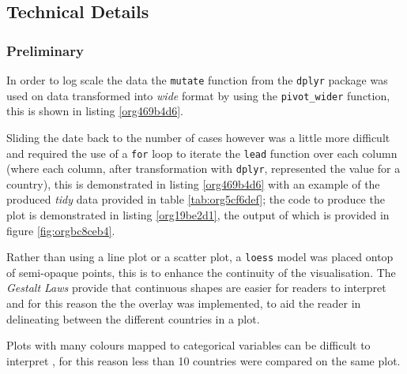 \documentclass[11pt]{article}
\begin{document}
\subsection{Technical Details}
\label{sec:org5b1072b}
\subsubsection{Preliminary}
\label{sec:org8718a60}
In order to log scale the data the \texttt{mutate} function from the \texttt{dplyr} package
was used on data transformed into \emph{wide} format by using the \texttt{pivot\_wider}
function, this is shown in listing \ref{org469b4d6}.

Sliding the date back to the number of cases however was a little more difficult
and required the use of a \texttt{for} loop to iterate the \texttt{lead} function over each
column (where each column, after transformation with \texttt{dplyr}, represented the
value for a country), this is demonstrated in listing \ref{org469b4d6} with an example of the
produced \emph{tidy} data provided in table \ref{tab:org5cf6def}; the code to produce the plot is
demonstrated in listing \ref{org19be2d1}, the output of which is provided in figure \ref{fig:orgbc8ceb4}.

Rather than using a line plot or a scatter plot, a \texttt{loess} model was placed ontop of semi-opaque points, this is to enhance the continuity of the visualisation. The \emph{Gestalt Laws} provide that continuous shapes are easier for readers to interpret \cite{staudinger2011} and for this reason the the overlay was implemented, to aid the reader in delineating between the different countries in a plot.

Plots with many colours mapped to categorical variables can be difficult to interpret \cite{wilson2017,rost2018}, for this reason less than 10 countries were compared on the same plot.
\end{document}
